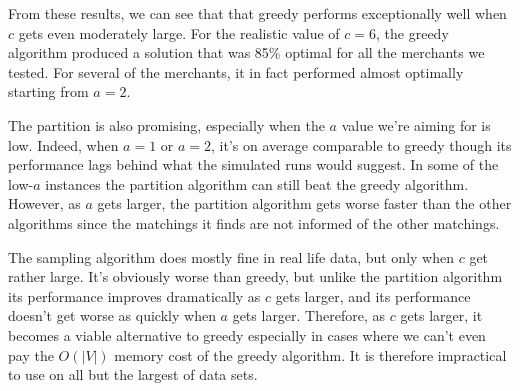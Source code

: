 From these results, we can see that that greedy performs exceptionally well when $c$ gets even moderately large.
For the realistic value of $c=6$, the greedy algorithm produced a solution that was 85\% optimal for all the
merchants we tested. For several of the merchants, it in fact performed almost optimally starting from $a=2$. \vs

The partition is also promising, especially when the $a$ value we're aiming for is low. Indeed, when $a=1$ or $a=2$,
it's on average comparable to greedy though its performance lags behind what the simulated runs would suggest. 
In some of the low-$a$ instances the partition algorithm can still beat the greedy algorithm. However, as $a$ gets larger,
the partition algorithm gets worse faster than the other algorithms since the matchings it finds are not informed
of the other matchings. \vs

The sampling algorithm does mostly fine in real life data, but only when $c$ get rather large. It's obviously worse
than greedy, but unlike the partition algorithm its performance improves dramatically as $c$ gets larger, and its 
performance doesn't get worse as quickly when $a$ gets larger. Therefore, as $c$ gets larger, it becomes a viable
alternative to greedy especially in cases where we can't even pay the $O(|V|)$ memory cost of the greedy algorithm.
It is therefore impractical to use on all but the largest of data sets.